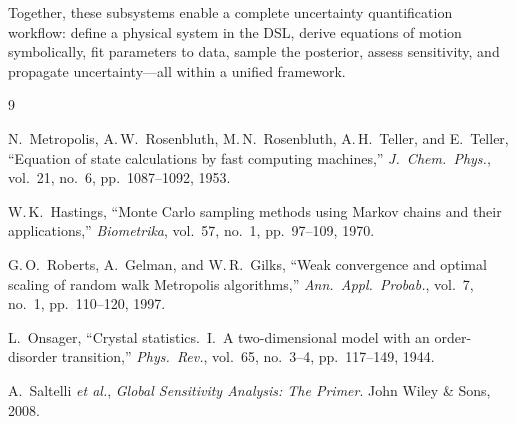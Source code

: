 \documentclass[11pt,letterpaper,twocolumn]{article}
\theoremstyle{definition}
\begin{document}
Together, these subsystems enable a complete uncertainty quantification workflow: define a physical system in the DSL, derive equations of motion symbolically, fit parameters to data, sample the posterior, assess sensitivity, and propagate uncertainty---all within a unified framework.

\begin{thebibliography}{9}

N.~Metropolis, A.\,W.~Rosenbluth, M.\,N.~Rosenbluth, A.\,H.~Teller, and E.~Teller,
``Equation of state calculations by fast computing machines,''
\textit{J.\ Chem.\ Phys.}, vol.~21, no.~6, pp.~1087--1092, 1953.

W.\,K.~Hastings,
``Monte Carlo sampling methods using Markov chains and their applications,''
\textit{Biometrika}, vol.~57, no.~1, pp.~97--109, 1970.

G.\,O.~Roberts, A.~Gelman, and W.\,R.~Gilks,
``Weak convergence and optimal scaling of random walk Metropolis algorithms,''
\textit{Ann.\ Appl.\ Probab.}, vol.~7, no.~1, pp.~110--120, 1997.

L.~Onsager,
``Crystal statistics.\ I.\ A two-dimensional model with an order-disorder transition,''
\textit{Phys.\ Rev.}, vol.~65, no.~3--4, pp.~117--149, 1944.

A.~Saltelli \textit{et al.},
\textit{Global Sensitivity Analysis: The Primer}.
John Wiley \& Sons, 2008.

\end{thebibliography}
\end{document}
